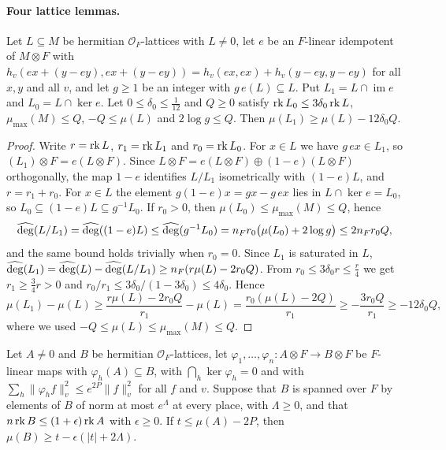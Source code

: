 \paragraph{Four lattice lemmas.}

\begin{lemma}[truncation]\label{cov:trunc}
Let $L\subseteq M$ be hermitian $\mathcal O_F$-lattices with $L\ne0$, let $e$ be an $F$-linear idempotent of $M\otimes F$ with $h_v(ex+(y-ey),ex+(y-ey))=h_v(ex,ex)+h_v(y-ey,y-ey)$ for all $x,y$ and all $v$, and let $g\ge1$ be an integer with $g\,e(L)\subseteq L$. Put $L_1=L\cap\operatorname{im}e$ and $L_0=L\cap\ker e$. Let $0\le\delta_0\le\frac1{12}$ and $Q\ge0$ satisfy $\operatorname{rk} L_0\le3\delta_0\operatorname{rk} L$, $\mu_{\max}(M)\le Q$, $-Q\le\mu(L)$ and $2\log g\le Q$. Then $\mu(L_1)\ge\mu(L)-12\delta_0Q$.
\end{lemma}

\begin{proof}
Write $r=\operatorname{rk} L$, $r_1=\operatorname{rk} L_1$ and $r_0=\operatorname{rk} L_0$. For $x\in L$ we have $g\,ex\in L_1$, so $(L_1)\otimes F=e(L\otimes F)$. Since $L\otimes F=e(L\otimes F)\oplus(1-e)(L\otimes F)$ orthogonally, the map $1-e$ identifies $L/L_1$ isometrically with $(1-e)L$, and $r=r_1+r_0$. For $x\in L$ the element $g(1-e)x=gx-g\,ex$ lies in $L\cap\ker e=L_0$, so $L_0\subseteq(1-e)L\subseteq g^{-1}L_0$. If $r_0>0$, then $\mu(L_0)\le\mu_{\max}(M)\le Q$, hence
\[
\widehat{\deg}(L/L_1)=\widehat{\deg}((1-e)L)\le\widehat{\deg}(g^{-1}L_0)=n_Fr_0\big(\mu(L_0)+2\log g\big)\le2n_Fr_0Q,
\]
and the same bound holds trivially when $r_0=0$. Since $L_1$ is saturated in $L$, $\widehat{\deg}(L_1)=\widehat{\deg}(L)-\widehat{\deg}(L/L_1)\ge n_F(r\mu(L)-2r_0Q)$. From $r_0\le3\delta_0r\le\frac r4$ we get $r_1\ge\frac34r>0$ and $r_0/r_1\le3\delta_0/(1-3\delta_0)\le4\delta_0$. Hence
\[
\mu(L_1)-\mu(L)\ge\frac{r\mu(L)-2r_0Q}{r_1}-\mu(L)=\frac{r_0(\mu(L)-2Q)}{r_1}\ge-\frac{3r_0Q}{r_1}\ge-12\delta_0Q,
\]
where we used $-Q\le\mu(L)\le\mu_{\max}(M)\le Q$.
\end{proof}

\begin{lemma}[descent]\label{cov:descent}
Let $A\ne0$ and $B$ be hermitian $\mathcal O_F$-lattices, let $\varphi_1,\dots,\varphi_n\colon A\otimes F\to B\otimes F$ be $F$-linear maps with $\varphi_h(A)\subseteq B$, with $\bigcap_h\ker\varphi_h=0$ and with $\sum_h\lVert\varphi_hf\rVert_v^2\le e^{2P}\lVert f\rVert_v^2$ for all $f$ and $v$. Suppose that $B$ is spanned over $F$ by elements of $B$ of norm at most $e^\Lambda$ at every place, with $\Lambda\ge0$, and that $n\operatorname{rk} B\le(1+\epsilon)\operatorname{rk} A$ with $\epsilon\ge0$. If $t\le\mu(A)-2P$, then $\mu(B)\ge t-\epsilon(\lvert t\rvert+2\Lambda)$.
\end{lemma}

